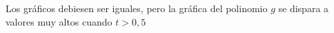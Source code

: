 \documentclass{udpreport}
\begin{document}
\begin{enumerate}
\begin{enumerate}
\begin{figure}[H]
    \hfill
    \end{figure}
     
Los gráficos debiesen ser iguales, pero la gráfica del polinomio $g$ se dispara a valores muy altos cuando $t>0,5$


\end{enumerate}
\end{enumerate}
\end{document}
